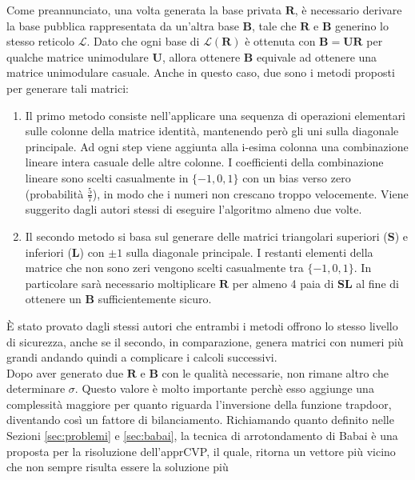 Come preannunciato, una volta generata la base privata $\mathbf{R}$, è necessario 
derivare la base pubblica rappresentata da un'altra base $\mathbf{B}$, tale che $\mathbf{R}$ 
e $\mathbf{B}$ generino lo stesso reticolo $\mathcal{L}$. Dato che ogni base di 
$\mathcal{L}(\mathbf{R})$ è ottenuta con $\mathbf{B} = \mathbf{U}\mathbf{R}$ per qualche matrice
unimodulare $\mathbf{U}$, allora ottenere $\mathbf{B}$ equivale ad ottenere una matrice
unimodulare casuale. Anche in questo caso, due sono i metodi proposti per generare tali matrici:
\begin{enumerate}
    \item \label{en:gghunim1} Il primo metodo consiste nell'applicare una sequenza di operazioni elementari 
    sulle colonne della matrice identità, mantenendo però gli uni sulla diagonale principale.
    Ad ogni step viene aggiunta alla i-esima colonna una combinazione lineare intera casuale
    delle altre colonne. I coefficienti della combinazione lineare sono scelti casualmente
    in $\{-1,0,1\}$ con un bias verso zero (probabilità $\frac{5}{7}$), in modo che i numeri non
    crescano troppo velocemente. Viene suggerito dagli autori stessi di eseguire l'algoritmo
    almeno due volte.
    \item \label{en:gghunim2} Il secondo metodo si basa sul generare delle matrici triangolari superiori 
    ($\mathbf{S}$) e inferiori ($\mathbf{L}$) con $\pm1$ sulla diagonale principale. I 
    restanti elementi della matrice che non sono zeri vengono scelti casualmente tra
    $\{-1,0,1\}$. In particolare sarà necessario moltiplicare $\mathbf{R}$ per almeno 4
    paia di $\mathbf{S}\mathbf{L}$ al fine di ottenere un $\mathbf{B}$ sufficientemente 
    sicuro.
\end{enumerate}
È stato provato dagli stessi autori che entrambi i metodi offrono lo stesso livello di sicurezza,
anche se il secondo, in comparazione, genera matrici con numeri più grandi andando quindi a 
complicare i calcoli successivi. \\
Dopo aver generato due $\mathbf{R}$ e $\mathbf{B}$ con le qualità necessarie, non
rimane altro che determinare $\sigma$. Questo valore è molto importante perchè esso aggiunge
una complessità maggiore per quanto riguarda l'inversione della funzione trapdoor, diventando
così un fattore di bilanciamento. Richiamando quanto definito nelle Sezioni \ref{sec:problemi}
e \ref{sec:babai}, la tecnica di arrotondamento di Babai è una proposta per la risoluzione 
dell'apprCVP, il quale, ritorna un vettore più vicino che non sempre risulta essere la soluzione più
